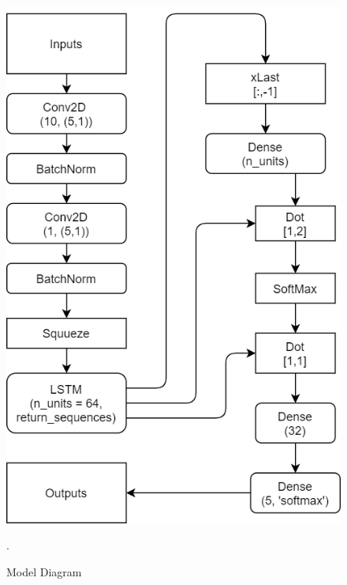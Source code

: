 \documentclass[11pt,english]{article}
\begin{document}
%
\begin{figure}[!ht]
\centering
\includegraphics[width=\columnwidth]{./Figs/Model.png}
\caption{ Model Diagram}.
\label{fig: Model}	
\end{figure}
\end{document}
